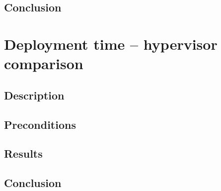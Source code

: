 \subsection*{Conclusion}

\section{Deployment time -- hypervisor comparison}
\subsection*{Description}
\subsection*{Preconditions}
\subsection*{Results}
\subsection*{Conclusion}


